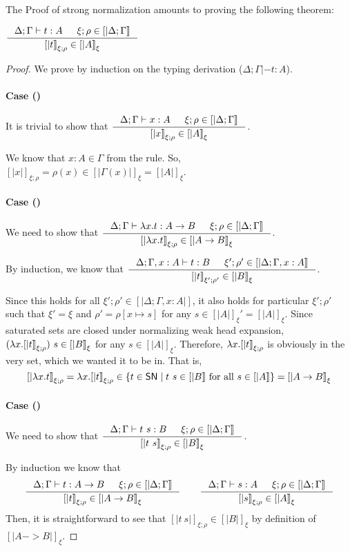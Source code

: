 The Proof of strong normalization amounts to proving the following theorem:
\begin{theorem}
$ \inference{\Delta;\Gamma|- t:A & \xi;\rho \in [|\Delta;\Gamma|]}
	    {[|t|]_{\xi;\rho} \in [|A|]_\xi} $
\end{theorem}
\begin{proof}
We prove by induction on the typing derivation ($\Delta;\Gamma|- t:A$).
\paragraph{Case ()}
It is trivial to show that
$ \inference{\Delta;\Gamma |- x:A & \xi;\rho \in [|\Delta;\Gamma|]}
	{[|x|]_{\xi;\rho} \in [|A|]_\xi} $.

We know that $x:A \in \Gamma$ from the  rule.
So, $[|x|]_{\xi;\rho} =\rho(x)\in[|\Gamma(x)|]_\xi = [|A|]_\xi$.

\paragraph{Case ()}
We need to show that
$ \inference{\Delta;\Gamma |- \l x.t : A -> B & \xi;\rho \in [|\Delta;\Gamma|]}
	{[|\l x.t|]_{\xi;\rho} \in [|A -> B|]_\xi} $.

By induction, we know that
$ \inference{\Delta;\Gamma,x:A |- t : B & \xi';\rho' \in [|\Delta;\Gamma,x:A|]}
	     {[|t|]_{\xi';\rho'} \in [|B|]_\xi} $.

Since this holds for all $\xi';\rho' \in [|\Delta;\Gamma,x:A|]$, it also holds
for particular $\xi';\rho'$ such that $\xi'=\xi$ and
$\rho' = \rho[x \mapsto s]$ for any $s \in [|A|]_\xi' = [|A|]_\xi$.
Since saturated sets are closed under normalizing weak head expansion,
$(\lambda x.[|t|]_{\xi;\rho})~s \in[|B|]_\xi$ for any $s\in[|A|]_\xi$.
Therefore, $\lambda x.[|t|]_{\xi;\rho}$ is obviously in the very set,
which we wanted it to be in. That is,
\[
[|\lambda x.t|]_{\xi;\rho} = \lambda x.[|t|]_{\xi;\rho}
\in \{t\in \mathsf{SN} \mid t~s\in[|B|] ~\text{for all}~ s\in[|A|]\} 
= [|A -> B|]_\xi
\]

\paragraph{Case ()}
We need to show that
$ \inference{\Delta;\Gamma |- t~s : B & \xi;\rho\in[|\Delta;\Gamma|]}{[|t~s|]_{\xi;\rho} \in [|B|]_\xi} $.

By induction we know that
\[
\inference{\Delta;\Gamma |- t : A -> B & \xi;\rho\in[|\Delta;\Gamma|]}{[|t|]_{\xi;\rho} \in [|A -> B|]_\xi}
\qquad
\inference{\Delta;\Gamma |- s : A & \xi;\rho\in[|\Delta;\Gamma|]}{[|s|]_{\xi;\rho} \in [|A|]_\xi}
\]
Then, it is straightforward to see that $[|t~s|]_{\xi;\rho}\in[|B|]_\xi$
by definition of $[|A -> B|]_\xi$.


\end{proof}
